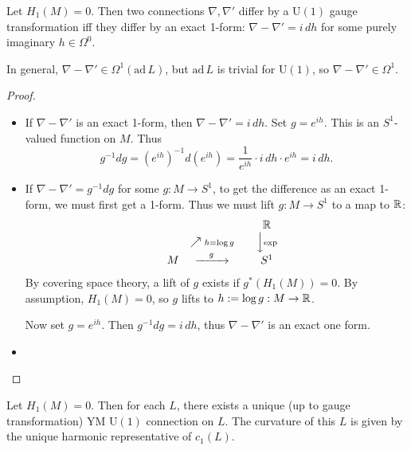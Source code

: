 \documentclass[main]{subfiles}
\begin{document}
\begin{lemma}
Let $H_1(M)=0$. Then two connections $\nabla,\nabla'$ differ by a $\mathrm{U}(1)$ gauge transformation iff they differ by an exact 1-form: $\nabla-\nabla' = i\,dh$ for some purely imaginary $h \in \Omega^0$.
\end{lemma}

\begin{remark}
In general, $\nabla-\nabla' \in \Omega^1(\mathrm{ad}\,L)$, but $\mathrm{ad}\,L$ is trivial for $\mathrm{U}(1)$, so $\nabla-\nabla' \in \Omega^1$.
\end{remark}

\begin{proof}\
	\begin{itemize}
	\item[($\Leftarrow$)] If $\nabla-\nabla'$ is an exact 1-form, then $\nabla-\nabla' = i\,dh$. Set $g=e^{ih}$. This is an $S^1$-valued function on $M$. Thus
\[
g^{-1}dg = (e^{ih})^{-1}d(e^{ih}) = \frac{1}{e^{ih}}\cdot i\,dh\cdot e^{ih} = i\,dh.
\]

\item[$\Rightarrow$] If $\nabla - \nabla' = g^{-1}dg$ for some $g:M\to S^1$, to get the difference as an exact 1-form, we must first get a 1-form. Thus we must lift $g:M\to S^1$ to a map to $\mathbb R$:
\[
\begin{array}{ccccc}
 & & & & \mathbb R \\
 & & \nearrow{\scriptstyle h = \log g} & & \Big\downarrow{\scriptstyle \exp} \\
 & M & \xrightarrow{\hspace{1em} g \hspace{1em}} & & S^1
\end{array}
\]
By covering space theory, a lift of $g$ exists if $g^\ast(H_1(M))=0$. By assumption, $H_1(M)=0$, so $g$ lifts to $h := \log g : M \to \mathbb R$.

Now set $g=e^{ih}$. Then $g^{-1}dg = i\,dh$, thus $\nabla-\nabla'$ is an exact one form.
	\item  
	\end{itemize}
\end{proof}

\begin{lemma}
Let $H_1(M)=0$. Then for each $L$, there exists a unique (up to gauge transformation) YM $\mathrm{U}(1)$ connection on $L$. The curvature of this $L$ is given by the unique harmonic representative of $c_1(L)$.
\end{lemma}
\end{document}
